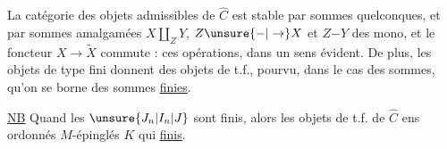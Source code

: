 La catégorie des objets admissibles de $\widehat C$ est stable par  sommes quelconques, et par sommes amalgamées $X\amalg_Z Y$,  $Z\unsure{\mathord{-}|\to}X$ et $Z\mathord{-}Y$ des mono, et le foncteur $X\to\widetilde X$ commute : ces opérations, dans un sens évident. De plus, les objets de type fini donnent des objets de t.f., pourvu, \unsure{(}dans le cas des sommes\unsure{)|,}, qu'on se borne  des sommes \uline{finies}.

\uline{NB} Quand les $\unsure{J_n|I_n|J}$ sont finis, alors les objets  de t.f. de $\widehat C$   ens ordonnés $M$-épinglés $K$ qui  \uline{finis}.
